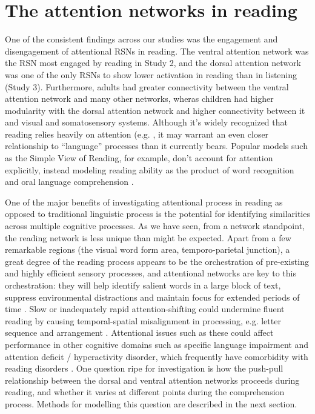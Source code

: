 \section{The attention networks in reading}

One of the consistent findings across our studies was the engagement and disengagement of attentional RSNs in reading. The ventral attention network was the RSN most engaged by reading in Study 2, and the dorsal attention network was one of the only RSNs to show lower activation in reading than in listening (Study 3). Furthermore, adults had greater connectivity between the ventral attention network and many other networks, wheras children had higher modularity with the dorsal attention network and higher connectivity between it and visual and somatosensory systems. Although it's widely recognized that reading relies heavily on attention (e.g. \citep{Vogel2012, Vidyasagar2010, Clifton2016}, it may warrant an even closer relationship to ``language'' processes than it currently bears. Popular models such as the Simple View of Reading, for example, don't account for attention explicitly, instead modeling reading ability as the product of word recognition and oral language comprehension \citep{Gough1988}. 

One of the major benefits of investigating attentional process in reading as opposed to traditional linguistic process is the potential for identifying similarities across multiple cognitive processes. As we have seen, from a network standpoint, the reading network is less unique than might be expected. Apart from a few remarkable regions (the visual word form area, temporo-parietal junction), a great degree of the reading process appears to be the orchestration of pre-existing and highly efficient sensory processes, and attentional networks are key to this orchestration: they will help identify salient words in a large block of text, suppress environmental distractions and maintain focus for extended periods of time \citep{Fedorenko2014}. Slow or inadequately rapid attention-shifting could undermine fluent reading by causing temporal-spatial misalignment in processing, e.g. letter sequence and arrangement \citep{Lallier2009}. Attentional issues such as these could affect performance in other cognitive domains such as specific language impairment and attention deficit / hyperactivity disorder, which frequently have comorbidity with reading disorders \citep{Pennington2006, Margari2013}. One question ripe for investigation is how the push-pull relationship between the dorsal and ventral attention networks proceeds during reading, and whether it varies at different points during the comprehension process. Methods for modelling this question are described in the next section.


